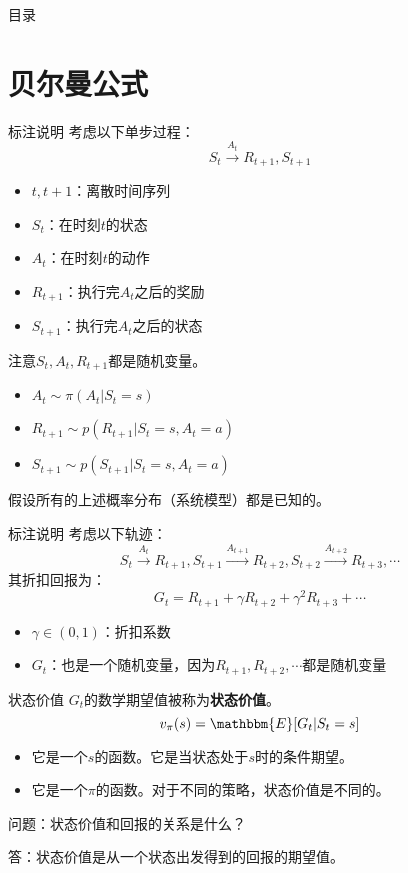 \begin{frame}{目录}
    \tableofcontents
\end{frame}

\section{贝尔曼公式}

\begin{frame}{标注说明}
    考虑以下单步过程：
    \[
        S_t\xrightarrow{A_t}R_{t+1},S_{t+1}
    \]
    \begin{itemize}
        \item $t,t+1$：离散时间序列
        \item $S_t$：在时刻$t$的状态
        \item $A_t$：在时刻$t$的动作
        \item $R_{t+1}$：执行完$A_t$之后的奖励
        \item $S_{t+1}$：执行完$A_t$之后的状态
    \end{itemize}
    注意$S_t,A_t,R_{t+1}$都是随机变量。

    \begin{itemize}
        \item $A_t\sim \pi(A_t|S_t=s)$
        \item $R_{t+1}\sim p(R_{t+1}|S_t=s,A_t=a)$
        \item $S_{t+1}\sim p(S_{t+1}|S_t=s,A_t=a)$
    \end{itemize}
    假设所有的上述概率分布（系统模型）都是已知的。
\end{frame}

\begin{frame}{标注说明}
    考虑以下轨迹：
    \[
        S_t\xrightarrow{A_t}R_{t+1},S_{t+1}\xrightarrow{A_{t+1}}R_{t+2},S_{t+2}\xrightarrow{A_{t+2}}R_{t+3},\cdots
    \]
    其折扣回报为：
    \[
        G_t=R_{t+1}+\gamma R_{t+2}+\gamma^2 R_{t+3}+\cdots
    \]
    \begin{itemize}
        \item $\gamma\in(0,1)$：折扣系数
        \item $G_t$：也是一个随机变量，因为$R_{t+1},R_{t+2},\cdots$都是随机变量
    \end{itemize}
\end{frame}

\begin{frame}{状态价值}
    $G_t$的数学期望值被称为\textbf{状态价值}。
    \[
        v_{\pi}(s)=\mathbbm{E}[G_t|S_t=s]
    \]
    \begin{itemize}
        \item 它是一个$s$的函数。它是当状态处于$s$时的条件期望。
        \item 它是一个$\pi$的函数。对于不同的策略，状态价值是不同的。
    \end{itemize}
    问题：状态价值和回报的关系是什么？

    答：状态价值是从一个状态出发得到的回报的期望值。
\end{frame}

